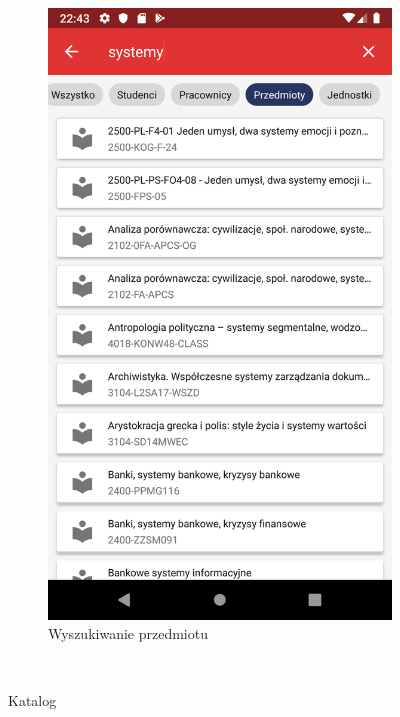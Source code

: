 \documentclass{pracamgr}
\begin{document}
\begin{figure}[p]
\begin{subfigure}[t]{0.3\textwidth}
	\end{subfigure}
	\quad
	\begin{subfigure}[t]{0.3\textwidth}
		\includegraphics[width=\textwidth]{img/search_systemy.png}
		\caption{Wyszukiwanie przedmiotu}
		\label{fig:search_systemy}
	\end{subfigure}
	\\
	\caption{Katalog}\label{fig:search}
	\medskip
\end{figure}
\end{document}
